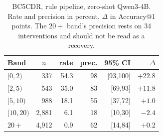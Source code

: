 \documentclass[11pt]{article}
\makeatletter
\newcommand{\acc}{Accuracy@1}
\makeatother
\begin{document}
\begin{table}[h]
\centering\small
\setlength{\tabcolsep}{3.4pt}
\begin{tabular}{lrrrrr}
\toprule
Band & \multicolumn{1}{c}{$n$} & rate & prec. & 95\% CI & $\Delta$ \\
\midrule
$[0,2)$    & 337   & 54.3 & 98 & [93,100] & $+22.8$ \\
$[2,5)$    & 543   & 35.0 & 83 & [69,93]  & $+11.8$ \\
$[5,10)$   & 988   & 18.1 & 55 & [37,72]  & $+1.0$ \\
$[10,20)$  & 2{,}881 & 6.1 & 18 & [10,30]  & $-2.4$ \\
$20+$      & 4{,}912 & 0.9 & 62 & [14,84]  & $+0.2$ \\
\bottomrule
\end{tabular}
\caption{BC5CDR, rule pipeline, zero-shot Qwen3-4B. Rate and precision in percent,
$\Delta$ in \acc{} points. The $20+$ band's precision rests on 34 interventions and
should not be read as a recovery.}
\label{tab:bands}
\end{table}
\end{document}
